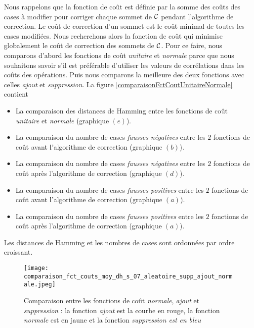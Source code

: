
Nous rappelons que la fonction de co\^ut est d\'efinie par la somme des co\^uts des cases \`a modifier pour corriger chaque sommet de $\cal C$ pendant l'algorithme de correction. 
Le co\^ut de correction d'un sommet est le co\^ut minimal de toutes les cases modifi\'ees. 
Nous recherchons alors la fonction de co\^ut qui minimise globalement le co\^ut de correction des sommets de $\cal C$.
Pour ce faire, nous comparons d'abord les fonctions de co\^ut {\em unitaire} et {\em normale} parce que nous souhaitons savoir s'il est pr\'ef\'erable d'utiliser les valeurs de corr\'elations dans les co\^uts des op\'erations. Puis nous comparons la meilleure des deux fonctions avec celles {\em ajout} et {\em suppression}.
La figure \ref{comparaisonFctCoutUnitaireNormale} contient 
\begin{itemize}
	\item La comparaison des distances de Hamming entre les  fonctions de co\^ut {\em unitaire} et {\em normale} (graphique $(e)$).
	\item La comparaison du nombre de cases {\em fausses n\'egatives} entre les $2$ fonctions de co\^ut avant l'algorithme de correction (graphique $(b)$).
	\item  La comparaison du nombre de cases {\em fausses n\'egatives} entre les $2$ fonctions de co\^ut apr\`es l'algorithme de correction (graphique $(d)$).
	\item La comparaison du nombre de cases {\em fausses positives} entre les $2$ fonctions de co\^ut avant l'algorithme de correction (graphique $(a)$).
	\item  La comparaison du nombre de cases {\em fausses positives} entre les $2$ fonctions de co\^ut apr\`es l'algorithme de correction (graphique $(a)$).
\end{itemize}
Les distances de Hamming et les nombres de cases sont ordonn\'ees par ordre croissant.
\vspace{-0.5cm}
\begin{figure}[htb!] 
\centering
\texttt{[image: comparaison\_fct\_couts\_moy\_dh\_s\_07\_aleatoire\_supp\_ajout\_normale.jpeg]}
\caption{ Comparaison entre les fonctions de co\^ut {\em normale},  {\em ajout} et  {\em suppression} : la fonction {\em ajout} est la courbe en rouge, la fonction {\em normale} est en jaune et la fonction {\em suppression est en bleu}}
\label{comparaisonFctCoutNormaleAjoutSuppression} 
\end{figure}
